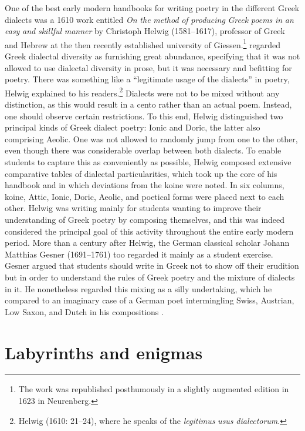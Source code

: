 One of the best early modern handbooks for writing poetry in the different Greek dialects was a 1610 work entitled \textit{On} \textit{the} \textit{method} \textit{of} \textit{producing} \textit{Greek} \textit{poems} \textit{in} \textit{an} \textit{easy} \textit{and} \textit{skillful} \textit{manner} by Christoph Helwig (1581–1617), professor of Greek and Hebrew at the then recently established university of Giessen.\footnote{The work was republished posthumously in a slightly augmented edition in 1623 in Neurenberg.} \citet[19]{Helwig1610} regarded Greek dialectal diversity as furnishing great abundance, specifying that it was not allowed to use dialectal diversity in prose, but it was necessary and befitting for poetry. There was something like a “legitimate usage of the dialects” in poetry, Helwig explained to his readers.\footnote{Helwig (1610: 21–24), where he speaks of the \textit{legitimus} \textit{usus} \textit{dialectorum}.} Dialects were not to be mixed without any distinction, as this would result in a cento rather than an actual poem. Instead, one should observe certain restrictions. To this end, Helwig distinguished two principal kinds of Greek dialect poetry: Ionic and Doric, the latter also comprising Aeolic. One was not allowed to randomly jump from one to the other, even though there was considerable overlap between both dialects. To enable students to capture this as conveniently as possible, Helwig composed extensive comparative tables of dialectal particularities, which took up the core of his handbook and in which deviations from the koine were noted. In six columns, koine, Attic, Ionic, Doric, Aeolic, and poetical forms were placed next to each other. Helwig was writing mainly for students wanting to improve their understanding of Greek poetry by composing themselves, and this was indeed considered the principal goal of this activity throughout the entire early modern period. More than a century after Helwig, the German classical scholar Johann Matthias Gesner (1691–1761) too regarded it mainly as a student exercise. Gesner argued that students should write in Greek not to show off their erudition but in order to understand the rules of Greek poetry and the mixture of dialects in it. He nonetheless regarded this mixing as a silly undertaking, which he compared to an imaginary case of a German poet intermingling Swiss, Austrian, Low Saxon, and Dutch in his compositions \citep[162]{Gesner1774}.

\section{Labyrinths and enigmas}


